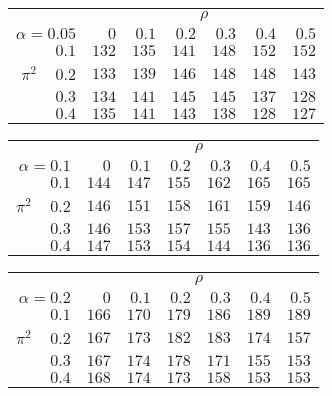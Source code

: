 \begin{tabular}{r|rrrrrr}
\hline\hline
 &\multicolumn{6}{c}{$\rho$} \\ 
 $\alpha = 0.05$ & $0$ & $0.1$ & $0.2$ & $0.3$ & $0.4$ & $0.5$ \\ 
 \hline$0.1$ & $132$ & $135$ & $141$ & $148$ & $152$ & $152$\\ 
$\pi^2\;\;\;$ $0.2$ & $133$ & $139$ & $146$ & $148$ & $148$ & $143$\\ 
$0.3$ & $134$ & $141$ & $145$ & $145$ & $137$ & $128$\\ 
$0.4$ & $135$ & $141$ & $143$ & $138$ & $128$ & $127$\\ 
 \hline 
 \end{tabular}
 
 \vspace{2em} 
 
\begin{tabular}{r|rrrrrr}
\hline\hline
 &\multicolumn{6}{c}{$\rho$} \\ 
 $\alpha = 0.1$ & $0$ & $0.1$ & $0.2$ & $0.3$ & $0.4$ & $0.5$ \\ 
 \hline$0.1$ & $144$ & $147$ & $155$ & $162$ & $165$ & $165$\\ 
$\pi^2\;\;\;$ $0.2$ & $146$ & $151$ & $158$ & $161$ & $159$ & $146$\\ 
$0.3$ & $146$ & $153$ & $157$ & $155$ & $143$ & $136$\\ 
$0.4$ & $147$ & $153$ & $154$ & $144$ & $136$ & $136$\\ 
 \hline 
 \end{tabular}
 
 \vspace{2em} 
 
\begin{tabular}{r|rrrrrr}
\hline\hline
 &\multicolumn{6}{c}{$\rho$} \\ 
 $\alpha = 0.2$ & $0$ & $0.1$ & $0.2$ & $0.3$ & $0.4$ & $0.5$ \\ 
 \hline$0.1$ & $166$ & $170$ & $179$ & $186$ & $189$ & $189$\\ 
$\pi^2\;\;\;$ $0.2$ & $167$ & $173$ & $182$ & $183$ & $174$ & $157$\\ 
$0.3$ & $167$ & $174$ & $178$ & $171$ & $155$ & $153$\\ 
$0.4$ & $168$ & $174$ & $173$ & $158$ & $153$ & $153$\\ 
 \hline 
 \end{tabular}